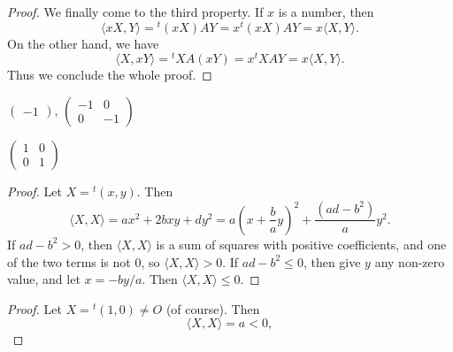 {{\begin{Solution}
{\begin{proof}
                We finally come to the third property. 
                If $x$ is a number, then 
                \begin{equation*}
                    \langle xX, Y \rangle = {^{t\!}(xX)} A Y = x {^{t\!}(xX)} A Y = x \langle X, Y\rangle. 
                \end{equation*}
                On the other hand, we have 
                \begin{equation*}
                    \langle X, xY \rangle = {^{t\!}X} A (xY) = x {^{t\!}X} A Y = x \langle X, Y \rangle. 
                \end{equation*}
                Thus we conclude the whole proof. 
            \end{proof}
            \item 
            $\begin{pmatrix} -1 \end{pmatrix}$, $\begin{pmatrix} -1 & 0 \\ 0 & -1 \end{pmatrix}$ 
            \item
            $\begin{pmatrix} 1 & 0 \\ 0 & 1 \end{pmatrix}$
            \item 
            \begin{proof}
                Let $X = {^{t\!}(x, y)}$. 
                Then 
                \begin{equation*}
                    \langle X, X \rangle = ax^2 + 2bxy + dy^2 = a \left( x + \frac{b}{a}y \right)^2 + \frac{(ad - b^2)}{a} y^2. 
                \end{equation*}
                If $ad - b^2 > 0$, then $\langle X, X \rangle$ is a sum of squares with positive coefficients, and one of the two terms is not $0$, so $\langle X, X \rangle > 0$. 
                If $ad - b^2 \leq 0$, then give $y$ any non-zero value, and let $x = -by/a$. 
                Then $\langle X, X \rangle \leq 0$. 
            \end{proof}
            \item 
            \begin{proof}
                Let $X = {^{t\!}(1, 0)} \neq O$ (of course). 
                Then 
                \begin{equation*}
                    \langle X, X \rangle = a < 0, 
                \end{equation*}

\end{proof}}
\end{Solution}}}
